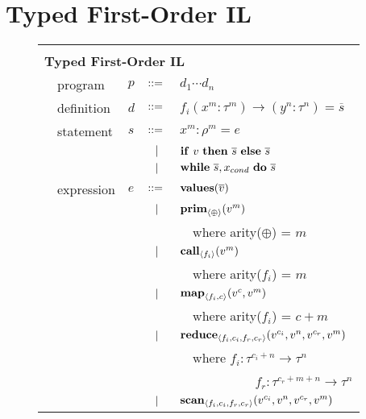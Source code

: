 \documentclass[preprint]{sigplanconf}
\begin{document}
\section{Typed First-Order IL}
\begin{figure}[h!]
  \begin{tabular}{| m{0.01cm}m{1.3cm}m{0.1cm}m{0.2cm}p{5.0cm} |}
  \hline
    & & & &\\
   \multicolumn{5}{|l|}{\textbf{Typed First-Order IL}}  \\[4pt]
  & program & $p$ &  $::=$   &  $d_1 \cdots d_n $ \\[4pt]
  & definition & $d$ & $::=$ & $f_i(x^m : \tau^m) \rightarrow (y^n : \tau^n) = \overline{s} $ \\[4pt]
  & statement  & $s$ & $::=$ & $x^m : \rho^m = e $\\[2pt]
  &            &     & $\ \ | \ \ $    & $\mbox{\textbf{if}} ~v~ \mbox{\textbf{then}} ~\overline{s}~ \mbox{\textbf{else}} ~ \overline{s}$ \\[2pt]
  &            &     & $\ \ | \ \ $    & $\mbox{\textbf{while}} ~ \overline{s}, x_{cond} ~ \mbox{\textbf{do}} ~ \overline{s} ~  $ \\[4pt]
  & expression & $e$ & $::=$ & $\mbox{\textbf{values}}(\overline{v})$ \\[2pt]
  &            &     & $\ \ | \ \ $    & $\mbox{\textbf{prim}}_{\left\langle \oplus \right\rangle }(v^m)$ \\[1.5pt]
  &            &     &           & ~~\small{where arity($\oplus$) = $m$} \\[2pt]
  &            &     & $\ \ | \ \ $    & $\mbox{\textbf{call}} _{\left\langle f_i  \right\rangle } (v^m)$ \\[1.5pt] 
  &            &     &           & ~~\small{where arity($f_i$) = $m$} \\[2pt]
  &            &     & $\ \ | \ \ $    & $\mbox{\textbf{map}} _{\left\langle f_i, c \right\rangle}(v^c, v^m)$ \\[1.5pt]
  &            &     &           & ~~\small{where arity($f_i$) = $c+m$} \\[2pt]
  &            &     & $\ \ | \ \ $    & $\mbox{\textbf{reduce}} _{ \left\langle f_i, c_i, f_r, c_r \right\rangle } (v^{c_i}, v^n, v^{c_r}, v^{m})$ \\[1.5pt]
  &            &     &           & ~~\small{where $f_i : \tau^{c_i + n} \rightarrow \tau^n$} \\[1.5pt]
  &            &     &           & ~~~~~~~~~~~ \small{$f_r : \tau^{c_r + m + n} \rightarrow \tau^n$} \\[2pt]
  &            &     & $\ \ | \ \ $    & $\mbox{\textbf{scan}} _{ \left\langle f_i, c_i, f_r, c_r \right\rangle} (v^{c_i}, v^n, v^{c_r}, v^{m})$ \\[1.5pt]

\end{tabular}
\end{figure}
\end{document}
